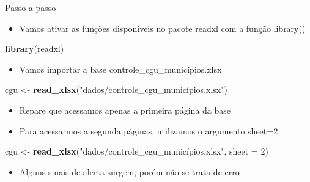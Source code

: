 \documentclass[
  10pt,
  ignorenonframetext,
]{beamer}
\newenvironment{Shaded}{\begin{snugshade}}{\end{snugshade}}
\newcommand{\DataTypeTok}[1]{\textcolor[rgb]{0.13,0.29,0.53}{#1}}
\newcommand{\DecValTok}[1]{\textcolor[rgb]{0.00,0.00,0.81}{#1}}
\newcommand{\KeywordTok}[1]{\textcolor[rgb]{0.13,0.29,0.53}{\textbf{#1}}}
\newcommand{\NormalTok}[1]{#1}
\newcommand{\StringTok}[1]{\textcolor[rgb]{0.31,0.60,0.02}{#1}}
\providecommand{\tightlist}{%
  \setlength{\itemsep}{0pt}\setlength{\parskip}{0pt}}
\begin{document}
\begin{frame}[fragile]{Passo a passo}
\protect\hypertarget{passo-a-passo-3}{}
\begin{itemize}
\tightlist
\item
  Vamos ativar as funções disponíveis no pacote readxl com a função
  library()
\end{itemize}

\begin{Shaded}
\begin{Highlighting}[]
\KeywordTok{library}\NormalTok{(readxl)}
\end{Highlighting}
\end{Shaded}

\begin{itemize}
\tightlist
\item
  Vamos importar a base controle\_cgu\_municípios.xlsx
\end{itemize}

\begin{Shaded}
\begin{Highlighting}[]
\NormalTok{cgu \textless{}{-}}\StringTok{ }
\KeywordTok{read\_xlsx}\NormalTok{(}\StringTok{"dados/controle\_cgu\_municípios.xlsx"}\NormalTok{)}
\end{Highlighting}
\end{Shaded}

\begin{itemize}
\tightlist
\item
  Repare que acessamos apenas a primeira página da base
\item
  Para acessarmos a segunda páginas, utilizamos o argumento sheet=2
\end{itemize}

\begin{Shaded}
\begin{Highlighting}[]
\NormalTok{cgu \textless{}{-}}\StringTok{ }
\KeywordTok{read\_xlsx}\NormalTok{(}\StringTok{"dados/controle\_cgu\_municípios.xlsx"}\NormalTok{, }
\DataTypeTok{sheet =} \DecValTok{2}\NormalTok{)}
\end{Highlighting}
\end{Shaded}

\begin{itemize}
\tightlist
\item
  Alguns sinais de alerta surgem, porém não se trata de erro
\end{itemize}
\end{frame}
\end{document}
